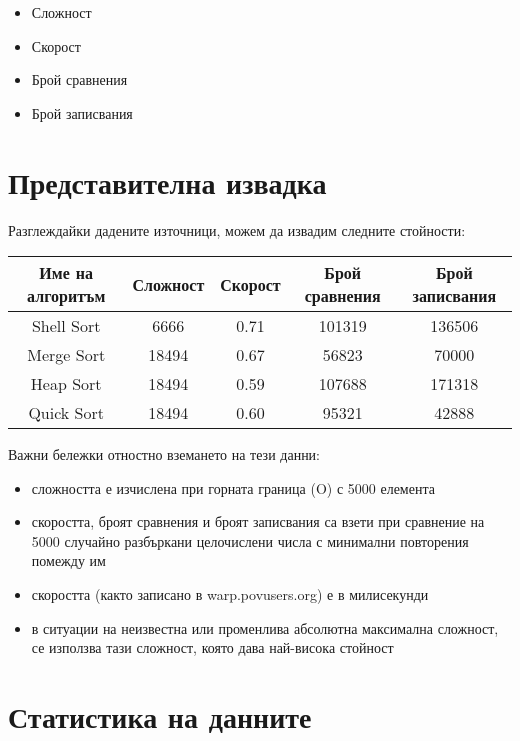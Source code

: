\documentclass[12pt,a4paper]{article}
\begin{document}
\begin{itemize}
\item Сложност
\item Скорост
\item Брой сравнения
\item Брой записвания
\end{itemize}

\newpage

\section{Представителна извадка}

Разглеждайки дадените източници, можем да извадим следните стойности:
\begin{center}
\begin{tabular}{|c|c c c c|}
	\hline
	Име на алгоритъм & Сложност & Скорост & Брой сравнения & Брой записвания \\[3pt]
	\hline\hline
	Shell Sort & 6666 & 0.71 & 101319 & 136506 \\[3pt]
	Merge Sort & 18494 & 0.67 & 56823 & 70000 \\[3pt]
	Heap Sort & 18494 & 0.59 & 107688 & 171318 \\[3pt]
	Quick Sort & 18494 & 0.60 & 95321 & 42888 \\[3pt]
	\hline
\end{tabular}
\end{center}

Важни бележки отностно вземането на тези данни: 
\begin{itemize}
\item сложността е изчислена при горната граница (O) с 5000 елемента
\item скоростта, броят сравнения и броят записвания са взети при сравнение на 5000 случайно разбъркани целочислени числа с минимални повторения помежду им\cite{comparing_algorithms}
\item скоростта (както записано в warp.povusers.org\cite{comparing_algorithms}) е в милисекунди
\item в ситуации на неизвестна или променлива абсолютна максимална сложност, се използва тази сложност, която дава най-висока стойност
\end{itemize}

\section{Статистика на данните}
\end{document}
